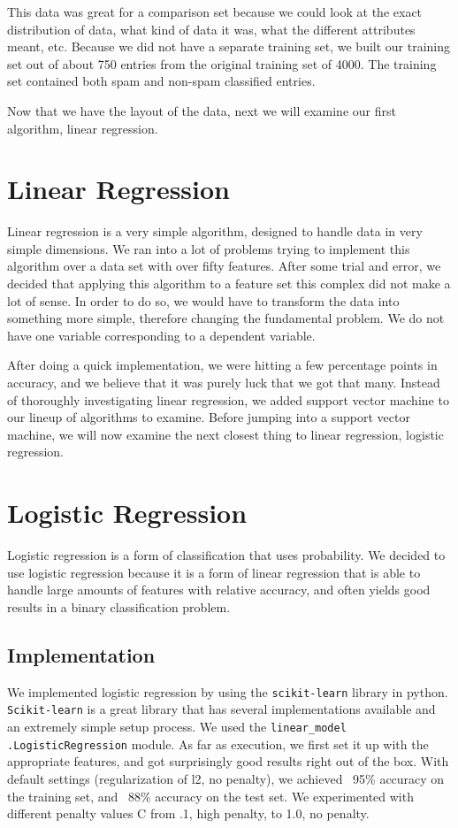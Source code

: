 \documentclass{article} %
\begin{document}
This data was great for a comparison set because we could look at the exact distribution
of data, what kind of data it was, what the different attributes meant, etc. Because we
did not have a separate training set, we built our training set out of about 750 entries
from the original training set of 4000. The training set contained both spam and non-spam
classified entries.

Now that we have the layout of the data, next we will examine our first algorithm,
linear regression.

\section{Linear Regression}
Linear regression is a very simple algorithm, designed to handle data in very simple
dimensions. We ran into a lot of problems trying to implement this algorithm over
a data set with over fifty features. After some trial and error, we decided that
applying this algorithm to a feature set this complex did not make a lot of sense.
In order to do so, we would have to transform the data into something more simple,
therefore changing the fundamental problem. We do not have one variable corresponding
to a dependent variable.

After doing a quick implementation, we were hitting a few percentage points in accuracy,
and we believe that it was purely luck that we got that many. Instead of thoroughly
investigating linear regression, we added support vector machine to our lineup of
algorithms to examine. Before jumping into a support vector machine, we will now
examine the next closest thing to linear regression, logistic regression.

\section{Logistic Regression}
Logistic regression is a form of classification that uses probability. We decided
to use logistic regression because it is a form of linear regression that is able
to handle large amounts of features with relative accuracy, and often yields good
results in a binary classification problem.
\subsection{Implementation}
We implemented logistic regression by using the \texttt{scikit-learn} library
in python. \texttt{Scikit-learn} is a great library that has several implementations
available and an extremely simple setup process. We used the \texttt{linear\_model}
\texttt{.LogisticRegression} module. As far as execution, we first set it up with
the appropriate features, and got surprisingly good results right out of the box.
With default settings (regularization of l2, no penalty), we achieved
~95\% accuracy on the training set, and ~88\% accuracy on the test set. We
experimented with different penalty values C from .1, high penalty,
to 1.0, no penalty.
\end{document}

